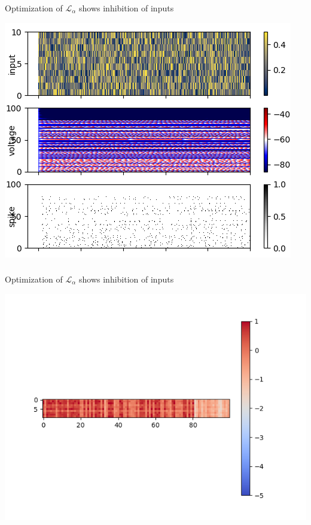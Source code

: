 \documentclass{beamer}
\begin{document}
\begin{frame}[plain]
\frametitle{} 
Optimization of $\mathcal{L}_{\alpha}$ shows inhibition of inputs

\begin{center}
\includegraphics[scale=0.7]{alpha-traces}
\end{center}

\end{frame}

\begin{frame}[plain]
\frametitle{} 
Optimization of $\mathcal{L}_{\alpha}$ shows inhibition of inputs

\begin{center}
\includegraphics[scale=0.65]{alpha-in-weights}
\end{center}

\end{frame}
\end{document}

